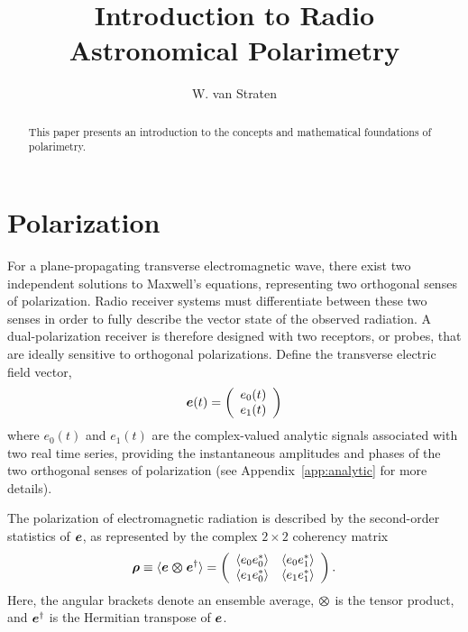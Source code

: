 \documentclass[twocolumn]{aastex6}
\newcommand{\mbf}[1]{\mbox{\boldmath $#1$}}
\newcommand{\App}[1]{Appendix~\ref{app:#1}}
\begin{document}
\title{ Introduction to Radio Astronomical Polarimetry }

\author{W. van Straten}

\begin{abstract}

  This paper presents an introduction to the concepts and mathematical
  foundations of polarimetry.
  
\end{abstract}



\section{Polarization}
\label{sec:polarization}

For a plane-propagating transverse electromagnetic wave, there exist
two independent solutions to Maxwell's equations, representing two
orthogonal senses of polarization.  Radio receiver systems must
differentiate between these two senses in order to fully describe the
vector state of the observed radiation.  A dual-polarization receiver
is therefore designed with two receptors, or probes, that are ideally
sensitive to orthogonal polarizations.  Define the transverse electric
field vector,
\begin{equation}
\mbf{e}(t) =
 \left( 
    \begin{array}{c}
      e_0(t) \\
      e_1(t)
    \end{array}
  \right)
\end{equation}
where $e_0(t)$ and $e_1(t)$ are the complex-valued analytic signals
associated with two real time series, providing the instantaneous
amplitudes and phases of the two orthogonal senses of polarization
(see \App{analytic} for more details).

The polarization of electromagnetic radiation is described by the
second-order statistics of $\mbf{e}$, as represented by the complex
$2\times2$ coherency matrix \citep{bw80}
\begin{equation}
  \label{eqn:coherency}
  \mbf{\rho}\equiv\langle\mbf{e \otimes e}^\dagger\rangle
  =\left( 
    \begin{array}{cc}
      \langle e_0e_0^*\rangle & \langle e_0e_1^*\rangle \\
      \langle e_1e_0^*\rangle & \langle e_1e_1^*\rangle
    \end{array}
  \right).
\end{equation}
Here, the angular brackets denote an ensemble average, $\mbf\otimes$
is the tensor product, and $\mbf{e}^\dagger$ is the Hermitian transpose
of $\mbf{e}$.
\end{document}
